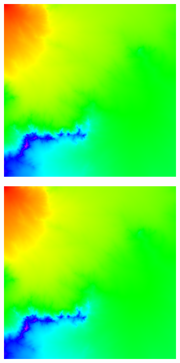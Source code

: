 \documentclass[11pt]{article}       %
\begin{document}
\begin{figure}
	\begin{subfigure}[b]{.3\columnwidth}
		\includegraphics[width=\textwidth]{Figures/fmm_cloudy}
	\end{subfigure}
	\begin{subfigure}[b]{.3\columnwidth}
		\includegraphics[width=\textwidth]{Figures/fim_cloudy}

\end{subfigure}
\end{figure}
\end{document}
